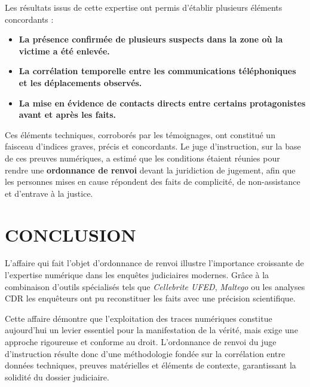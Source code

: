 \documentclass[memoire, 12pt]{report}
\begin{document}
Les résultats issus de cette expertise ont permis d’établir plusieurs éléments concordants :
\begin{itemize}
    \item \textbf{La présence confirmée de plusieurs suspects dans la zone où la victime a été enlevée.}
    \item \textbf{La corrélation temporelle entre les communications téléphoniques et les déplacements observés.}
    \item \textbf{La mise en évidence de contacts directs entre certains protagonistes avant et après les faits.}
\end{itemize}

Ces éléments techniques, corroborés par les témoignages, ont constitué un faisceau d’indices graves, précis et concordants. Le juge d’instruction, sur la base de ces preuves numériques, a estimé que les conditions étaient réunies pour rendre une \textbf{ordonnance de renvoi} devant la juridiction de jugement, afin que les personnes mises en cause répondent des faits de complicité, de non-assistance et d’entrave à la justice.




\newpage
\section*{CONCLUSION}
L’affaire qui fait l'objet d'ordonnance de renvoi illustre l’importance croissante de l’expertise numérique dans les enquêtes judiciaires modernes. Grâce à la combinaison d’outils spécialisés tels que \textit{Cellebrite UFED}, \textit{Maltego} ou les analyses CDR les enquêteurs ont pu reconstituer les faits avec une précision scientifique.  

Cette affaire démontre que l’exploitation des traces numériques constitue aujourd’hui un levier essentiel pour la manifestation de la vérité, mais exige une approche rigoureuse et conforme au droit.  
L’ordonnance de renvoi du juge d’instruction résulte donc d’une méthodologie fondée sur la corrélation entre données techniques, preuves matérielles et éléments de contexte, garantissant la solidité du dossier judiciaire.

\vspace{0.5cm}
\end{document}
